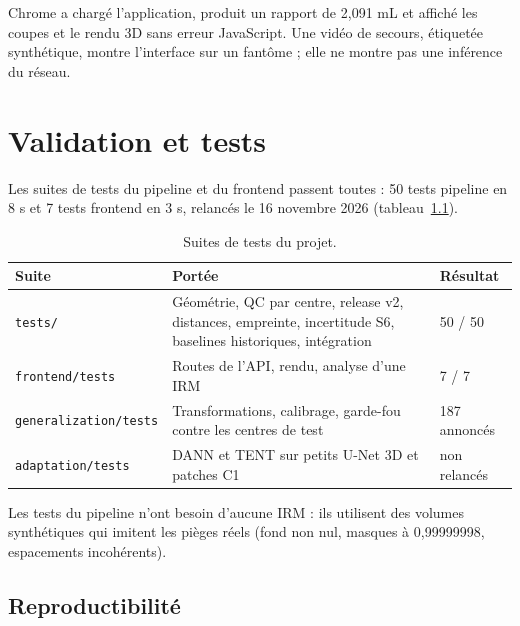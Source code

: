 \documentclass[11pt,a4paper]{report}
\newcommand{\fichier}[1]{\texttt{#1}}
\begin{document}
Chrome a chargé l'application, produit un rapport de 2,091 mL et affiché les
coupes et le rendu 3D sans erreur JavaScript. Une vidéo de secours, étiquetée
synthétique, montre l'interface sur un fantôme ; elle ne montre pas une
inférence du réseau.

\chapter{Validation et tests}

Les suites de tests du pipeline et du frontend passent toutes : 50 tests
pipeline en 8 s et 7 tests frontend en 3 s, relancés le 16 novembre 2026
(tableau~\ref{tab:tests}).

\begin{table}[H]
  \centering
  \caption{Suites de tests du projet.}
  \label{tab:tests}
  \begin{tabularx}{\textwidth}{lXl}
    \toprule
    \textbf{Suite} & \textbf{Portée} & \textbf{Résultat} \\
    \midrule
    \fichier{tests/} & Géométrie, QC par centre, release v2, distances,
      empreinte, incertitude S6, baselines historiques, intégration & 50 / 50 \\
    \fichier{frontend/tests} & Routes de l'API, rendu, analyse d'une IRM & 7 / 7 \\
    \fichier{generalization/tests} & Transformations, calibrage, garde-fou
      contre les centres de test & 187 annoncés \\
    \fichier{adaptation/tests} & DANN et TENT sur petits U-Net 3D et patches C1 & non relancés \\
    \bottomrule
  \end{tabularx}
\end{table}

Les tests du pipeline n'ont besoin d'aucune IRM : ils utilisent des volumes
synthétiques qui imitent les pièges réels (fond non nul, masques à
0,99999998, espacements incohérents).

\section{Reproductibilité}
\end{document}
